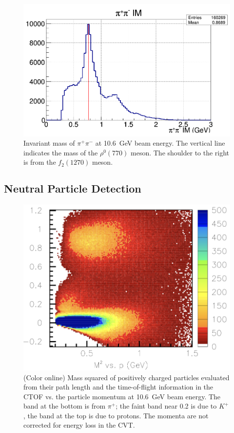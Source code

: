 \documentclass[final,3p,twocolumn]{elsarticle}
\begin{document}
\begin{figure}[t!]
\vspace{0.3cm}\centerline{\includegraphics[width=1.0\columnwidth]{rhoMass.png}}
\caption{Invariant mass of $\pi^+\pi^-$ at 10.6~GeV beam energy. The vertical line indicates the mass of the
  $\rho^0(770)$ meson. The shoulder to the right is from the $f_2(1270)$ meson.}
\label{pip-pim-p}
\end{figure} 

\subsection{Neutral Particle Detection} 

\begin{figure}[t!]
\centerline{\includegraphics[width=1.\columnwidth]{ctof-pid-3.png}}
\caption{(Color online) Mass squared of positively charged particles evaluated from their path length and the time-of-flight
  information in the CTOF vs. the particle momentum at 10.6~GeV beam energy. The band at the bottom is from
  $\pi^+$; the faint band near 0.2 is due to $K^+$, the band at the top is due to protons. The momenta are not
  corrected for energy loss in the CVT.}
\label{CD-PID}
\end{figure} 
\end{document}
